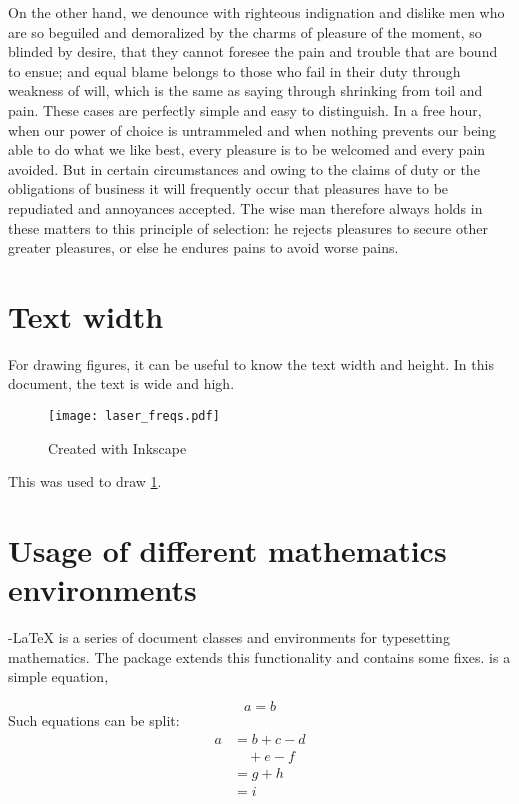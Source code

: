 On the other hand, we denounce with righteous indignation and dislike men who are so beguiled and demoralized by the charms of pleasure of the moment, so blinded by desire, that they cannot foresee the pain and trouble that are bound to ensue; and equal blame belongs to those who fail in their duty through weakness of will, which is the same as saying through shrinking from toil and pain. These cases are perfectly simple and easy to distinguish. In a free hour, when our power of choice is untrammeled and when nothing prevents our being able to do what we like best, every pleasure is to be welcomed and every pain avoided. But in certain circumstances and owing to the claims of duty or the obligations of business it will frequently occur that pleasures have to be repudiated and annoyances accepted. The wise man therefore always holds in these matters to this principle of selection: he rejects pleasures to secure other greater pleasures, or else he endures pains to avoid worse pains.

\section{Text width}

For drawing figures, it can be useful to know the text width and height. In this document, the text is \the\textwidth {} wide and \the\textheight {} high.

\begin{figure}[tb]
	\centering
	\texttt{[image: laser\_freqs.pdf]}
	\caption{Created with Inkscape}
	\label{fig:laser_freqs}
\end{figure}


This was used to draw \cref{fig:laser_freqs}.




\section{Usage of different mathematics environments}
 {\AmS}-{\LaTeX} is a series of document classes and environments for typesetting mathematics. The package  extends this functionality and contains some fixes.  is a simple equation,

\begin{equation}\label{eq:equation}
	a = b
\end{equation}
Such equations can be split:
\begin{equation}
	\begin{split}
		a& = b+c-d\\
		& \quad + e - f\\
		& = g+h\\
		& = i
	\end{split}
\end{equation}

